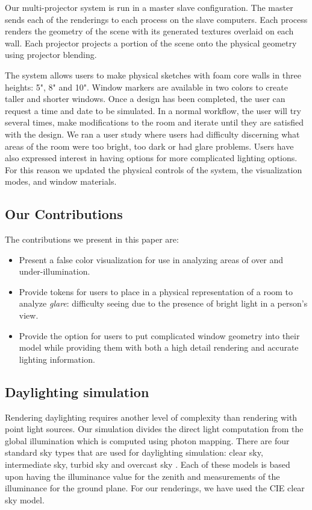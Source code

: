 \documentclass[10pt,twocolumn,letterpaper]{article}
\begin{document}
Our multi-projector system is run in a master slave configuration.
The master sends each of the renderings to each process on the slave
computers.  Each process renders the geometry of the scene with its
generated textures overlaid on each wall.  Each projector projects a
portion of the scene onto the physical geometry using projector
blending.

The system allows users to make physical sketches with foam core walls
in three heights: 5", 8" and 10".  Window markers are available in two colors
to create taller and shorter windows.  Once a design has been completed, 
the user can request a time and date to be simulated.  In a normal workflow,
the user will try several times, make modifications to the room and iterate 
until they are satisfied with the design.  We ran a user study where users
had difficulty discerning what areas of the room  were too bright, too dark or 
had glare problems.  Users have also expressed interest in having options for 
more complicated lighting options.  For this reason we updated the physical
controls of the system, the visualization modes, and window materials.

\subsection {Our Contributions}


The contributions we present in this paper are:

\begin{itemize}
\item Present a false color visualization for use in analyzing areas of over and under-illumination.
\item Provide tokens for users to place in a physical representation of a room to analyze \emph{glare}: difficulty seeing due to the presence of bright light in a person's view.
\item Provide the option for users to put complicated window geometry into their model while providing them with both a high detail rendering and accurate lighting information.
\end{itemize}


\subsection{Daylighting simulation}
Rendering daylighting requires another level of complexity than
rendering with point light sources.  Our simulation divides the direct
light computation from the global illumination which is computed using
photon mapping.  There are four standard sky types that are used for
daylighting simulation: clear sky, intermediate sky, turbid sky and
overcast sky \cite{international1994spatial,perez1990modeling}.  Each
of these models is based upon having the illuminance value for the
zenith \cite{Karayel1984283} and measurements of the illuminance for
the ground plane.  For our renderings, we have used the CIE clear sky
model.
\end{document}
